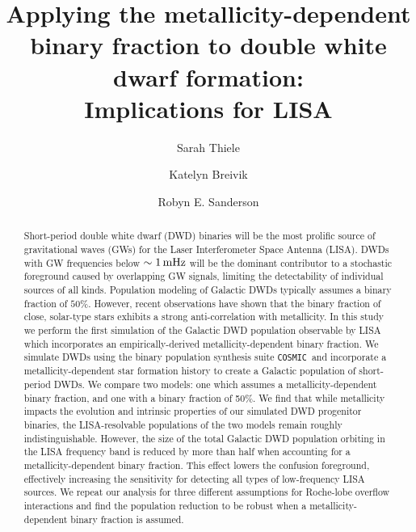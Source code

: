 \documentclass[twocolumn, linenumbers]{aastex631}
\newcommand{\cosmic}{\texttt{COSMIC}}
\begin{document}
\title{Applying the metallicity-dependent binary fraction to double white dwarf formation: \\ Implications for LISA}


\author[0000-0001-7442-6926]{Sarah Thiele}
\author[0000-0001-5228-6598]{Katelyn Breivik}
\author[0000-0003-3939-3297]{Robyn E. Sanderson}

\begin{abstract}
Short-period double white dwarf (DWD) binaries will be the most prolific source of gravitational waves (GWs) for the Laser Interferometer Space Antenna (LISA). DWDs with GW frequencies below $\sim1\,\rm{mHz}$ will be the dominant contributor to a stochastic foreground caused by overlapping GW signals, limiting the detectability of individual sources of all kinds. Population modeling of Galactic DWDs typically assumes a binary fraction of $50\%$. However, recent observations have shown that the binary fraction of close, solar-type stars exhibits a strong anti-correlation with metallicity. In this study we perform the first simulation of the Galactic DWD population observable by LISA which incorporates an empirically-derived metallicity-dependent binary fraction. We simulate DWDs using the binary population synthesis suite \cosmic\ and incorporate a metallicity-dependent star formation history to create a Galactic population of short-period DWDs. We compare two models: one which assumes a metallicity-dependent binary fraction, and one with a binary fraction of 50\%. We find that while metallicity impacts the evolution and intrinsic properties of our simulated DWD progenitor binaries, the LISA-resolvable populations of the two models remain roughly indistinguishable. However, the size of the total Galactic DWD population orbiting in the LISA frequency band is reduced by more than half when accounting for a metallicity-dependent binary fraction. This effect lowers the confusion foreground, effectively increasing the sensitivity for detecting all types of low-frequency LISA sources. We repeat our analysis for three different assumptions for Roche-lobe overflow interactions and find the population reduction to be robust when a metallicity-dependent binary fraction is assumed.
\end{abstract}
\end{document}
